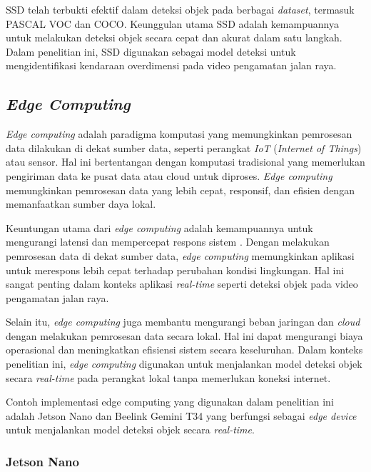 SSD telah terbukti efektif dalam deteksi objek pada berbagai \emph{dataset}, termasuk PASCAL VOC dan COCO. Keunggulan utama SSD adalah kemampuannya untuk melakukan deteksi objek secara cepat dan akurat dalam satu langkah. Dalam penelitian ini, SSD digunakan sebagai model deteksi untuk mengidentifikasi kendaraan overdimensi pada video pengamatan jalan raya.

\subsection{\emph{Edge Computing}}

\emph{Edge computing} adalah paradigma komputasi yang memungkinkan pemrosesan data dilakukan di dekat sumber data, seperti perangkat \emph{IoT} (\emph{Internet of Things}) atau sensor. Hal ini bertentangan dengan komputasi tradisional yang memerlukan pengiriman data ke pusat data atau cloud untuk diproses. \emph{Edge computing} memungkinkan pemrosesan data yang lebih cepat, responsif, dan efisien dengan memanfaatkan sumber daya lokal.

Keuntungan utama dari \emph{edge computing} adalah kemampuannya untuk mengurangi latensi dan mempercepat respons sistem \parencite*{aws2024}. Dengan melakukan pemrosesan data di dekat sumber data, \emph{edge computing} memungkinkan aplikasi untuk merespons lebih cepat terhadap perubahan kondisi lingkungan. Hal ini sangat penting dalam konteks aplikasi \emph{real-time} seperti deteksi objek pada video pengamatan jalan raya.

Selain itu, \emph{edge computing} juga membantu mengurangi beban jaringan dan \emph{cloud} dengan melakukan pemrosesan data secara lokal. Hal ini dapat mengurangi biaya operasional dan meningkatkan efisiensi sistem secara keseluruhan. Dalam konteks penelitian ini, \emph{edge computing} digunakan untuk menjalankan model deteksi objek secara \emph{real-time} pada perangkat lokal tanpa memerlukan koneksi internet. 

Contoh implementasi edge computing yang digunakan dalam penelitian ini adalah Jetson Nano dan Beelink Gemini T34 yang berfungsi sebagai \emph{edge device} untuk menjalankan model deteksi objek secara \emph{real-time}.

\subsubsection{Jetson Nano}

